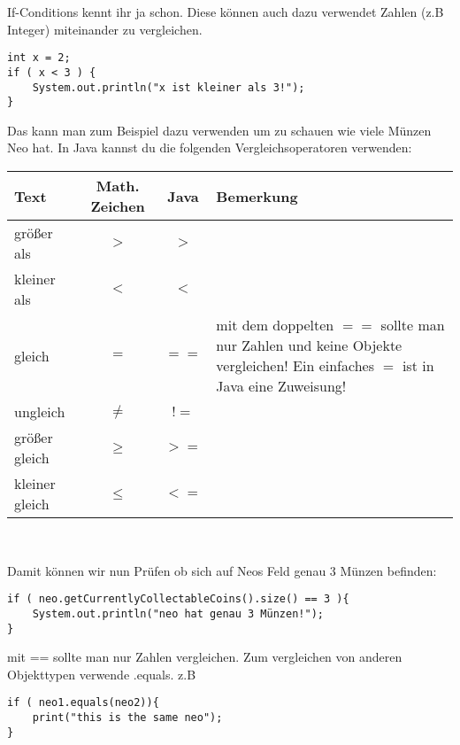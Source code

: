 \begin{Infobox}[If-Conditions 2]
If-Conditions kennt ihr ja schon. Diese können auch dazu verwendet Zahlen (z.B Integer) miteinander zu vergleichen.
\begin{lstlisting}
int x = 2;
if ( x < 3 ) {
	System.out.println("x ist kleiner als 3!");
}
\end{lstlisting}
Das kann man zum Beispiel dazu verwenden um zu schauen wie viele Münzen Neo hat. In Java kannst du die folgenden Vergleichsoperatoren verwenden:
\begin{center}
        \begin{tabular}{ l | c | c | l }
                Text & Math. Zeichen & Java & Bemerkung\\
            \hline
                  gr\"oßer als & $>$ & $>$ & \\
                  kleiner als & $<$ & $<$ & \\
                  gleich & $=$ & $==$ & \minibox{mit dem doppelten $==$ sollte man nur \\ Zahlen und keine Objekte vergleichen!\\ Ein einfaches $=$ ist in Java eine Zuweisung!}\\

                  ungleich & $\neq$ & $!=$ & \\
                  gr\"oßer gleich & $\geq$ & $>=$ &  \\

                  kleiner gleich & $\leq$ & $<=$ &  \\
        \end{tabular} \\
\end{center}

Damit können wir nun Prüfen ob sich auf Neos Feld genau 3 Münzen befinden:
\begin{lstlisting}
if ( neo.getCurrentlyCollectableCoins().size() == 3 ){
	System.out.println("neo hat genau 3 Münzen!");
}
\end{lstlisting}
\end{Infobox}
\begin{Infobox}[\lstinline{==} und \lstinline{.equals()}]
mit == sollte man nur Zahlen vergleichen. Zum vergleichen von anderen Objekttypen verwende .equals. z.B 
\begin{lstlisting}
if ( neo1.equals(neo2)){
	print("this is the same neo");
}
\end{lstlisting}

\end{Infobox}


